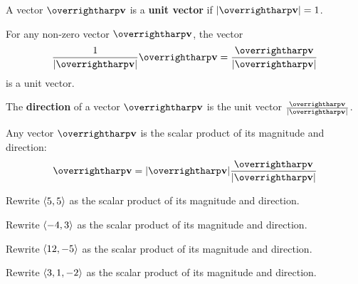 \documentclass[letterpaper, twoside, 12pt]{book}
\begin{document}
\begin{definition}
  A vector $\harpvec{v}$ is a \textbf{unit vector} if $|\harpvec v|=1$.
\end{definition}

\begin{theorem}
  For any non-zero vector $\harpvec{v}$, the vector
  \[
    \frac{1}{|\harpvec v|}\harpvec{v} = \frac{\harpvec v}{|\harpvec v|}
  \]
  is a unit vector.
\end{theorem}

\begin{definition}
  The \textbf{direction} of a vector $\harpvec v$ is the unit vector
  $\frac{\harpvec v}{|\harpvec v|}$.
\end{definition}

\begin{theorem}
  Any vector $\harpvec v$ is the scalar product of its magnitude and direction:
  \[
    \harpvec v = |\harpvec v|\frac{\harpvec v}{|\harpvec v|}
  \]
\end{theorem}



          \begin{problem}
            Rewrite $\langle5,5\rangle$ as the scalar product of its magnitude and
            direction.
          \end{problem}

          \begin{solution}

          \end{solution}

          \begin{problem}
            Rewrite $\langle-4,3\rangle$ as the scalar product of its magnitude and
            direction.
          \end{problem}

          \begin{solution}

          \end{solution}

          \begin{problem}
            Rewrite $\langle12,-5\rangle$ as the scalar product of its magnitude and
            direction.
          \end{problem}

          \begin{solution}

          \end{solution}

          \begin{problem}
            Rewrite $\langle3,1,-2\rangle$ as the scalar product of its magnitude and
            direction.
          \end{problem}
\end{document}
